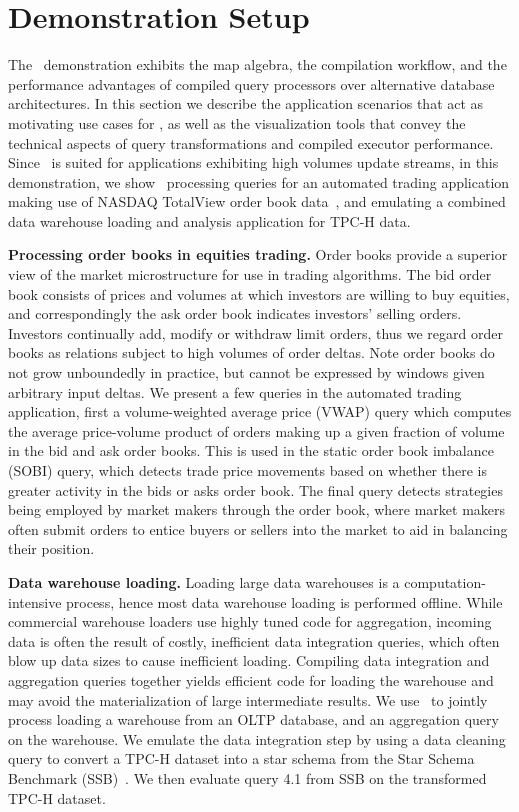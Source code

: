 
\section{Demonstration Setup}
The \compiler\ demonstration exhibits the map algebra, the compilation workflow,
and the performance advantages of compiled query processors over alternative
database architectures. In this section we describe the application scenarios
that act as motivating use cases for \compiler, as well as the visualization
tools that convey the technical aspects of query transformations and compiled
executor performance.
Since \compiler\ is suited for applications exhibiting high volumes update
streams, in this demonstration, we show \compiler\ processing queries for an
automated trading application making use of NASDAQ TotalView order book
data~\cite{totalview-url}, and emulating a combined data warehouse loading and
analysis application for TPC-H data. 

\smallskip
\noindent\textbf{Processing order books in equities trading.}
Order books provide a superior view of the market microstructure for use in
trading algorithms. The bid order book consists of prices and volumes at which
investors are willing to buy equities, and correspondingly the ask order book
indicates investors' selling orders.
Investors continually add, modify or withdraw limit orders, thus we regard order
books as relations subject to high volumes of order deltas. Note order books do
not grow unboundedly in practice, but cannot be expressed by windows given
arbitrary input deltas.
We present a few queries in the automated trading application, first a
volume-weighted average price (VWAP) query which computes the average
price-volume product of orders making up a given fraction of volume in the bid
and ask order books. This is used in the static order book imbalance (SOBI)
query, which detects trade price movements based on whether there is greater
activity in the bids or asks order book. The final query detects
strategies being employed by market makers through the order book, where market
makers often submit orders to entice buyers or sellers into the market to aid in
balancing their position.

\smallskip
\noindent\textbf{Data warehouse loading.}
Loading large data warehouses is a computation-intensive process, hence most data
warehouse loading is performed offline. While commercial warehouse loaders use
highly tuned code for aggregation, incoming data is often the result of costly,
inefficient data integration queries, which often blow up data sizes to cause
inefficient loading. Compiling data integration and aggregation queries together
yields efficient code for loading the warehouse and may avoid the
materialization of large intermediate results.
We use \compiler\ to jointly process loading a warehouse from an OLTP database,
and an aggregation query on the warehouse. We emulate the data integration step
by using a data cleaning query to convert a TPC-H dataset into a star schema from
the Star Schema Benchmark (SSB)~\cite{poneil-ssb:07}. We then evaluate query 4.1
from SSB on the transformed TPC-H dataset.

